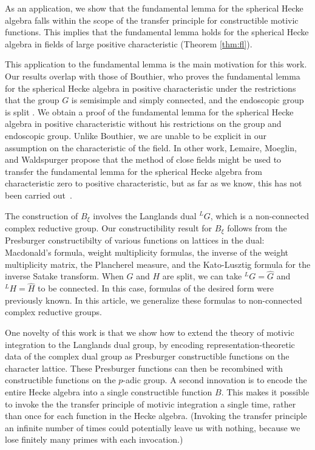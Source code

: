 As an application, we show that the fundamental lemma for the spherical Hecke algebra falls within
the scope of the transfer principle for constructible motivic functions.
This implies that the fundamental lemma holds for the spherical Hecke algebra in fields of large positive
characteristic (Theorem \ref{thm:fl}).

This application to the fundamental lemma is the main motivation for this work.  Our results overlap with
those of Bouthier, who proves the fundamental lemma for the spherical Hecke algebra in positive
characteristic under the restrictions that the group $G$ is semisimple and simply connected, 
and the endoscopic group is split \cite[Theorem~0.2]{bouthier}.  We obtain a proof of the fundamental lemma for the
spherical Hecke algebra in positive characteristic without his restrictions on the group and endoscopic group.
Unlike Bouthier, we are unable to be explicit in our assumption
on the characteristic of the field.  In other work,
Lemaire, Moeglin, and Waldspurger propose that the method of close fields might be used to transfer the
fundamental lemma for the spherical Hecke algebra from characteristic zero to positive characteristic, but as far as we know, 
this has not been
carried out~\cite[\S1.3]{LMW}.

The construction of $B_\xi$ involves the Langlands dual ${}^LG$, which is a non-connected complex reductive group.
Our constructibility result for $B_\xi$ follows from the  Presburger constructibilty of various
functions on lattices in the dual:  Macdonald's formula, weight multiplicity formulas, the inverse of the weight multiplicity matrix,
the Plancherel measure,
and the Kato-Lusztig formula for the inverse Satake transform.  
When $G$ and $H$ are split, we can take ${}^LG = \hat G$ and ${}^LH=\hat H$ to be connected.  In this case,
formulas of the desired form were previously known.  In this article, we
generalize these formulas to non-connected complex reductive groups.


One novelty of this work is that we show how to extend the theory of motivic integration to the Langlands
dual group, by encoding representation-theoretic data of the complex dual group as Presburger constructible functions on the character lattice. These
Presburger functions can then be recombined with constructible functions on the $p$-adic group.  A second innovation is
to encode the entire Hecke algebra into a single constructible function $B$.  This makes it possible to invoke the the transfer
principle of motivic integration a single time, rather than once for each function in the Hecke algebra.  (Invoking the transfer principle
an infinite number of times could potentially leave us with nothing, because we lose finitely many primes with each invocation.)

